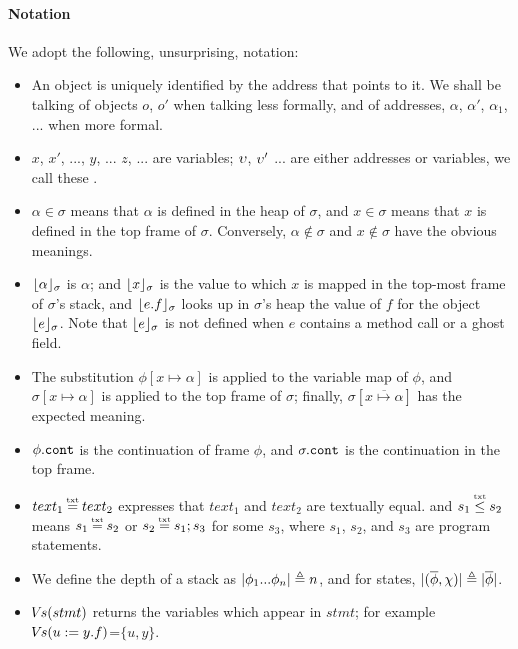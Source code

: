 {\paragraph{Notation} We adopt the following, unsurprising, notation:
\begin{itemize}
\item
{An object is uniquely identified by the address that points to it. We shall be talking of objects $o$, $o'$ when talking less formally, and of addresses, $\alpha$, $\alpha'$, $\alpha_1$, ...  when more formal.}
\item
$x$, $x'$,  ..., $y$, ... $z$, ... are variables;  $\upsilon$, $\upsilon'$ ... are either addresses or variables, we call these \emph{\atoms}.
\item
$\alpha \in \sigma$ means that $\alpha$ is defined in the heap of $\sigma$, and $x\in \sigma$ means that $x$ is defined in the top frame of $\sigma$.
Conversely,  $\alpha\notin\sigma$ and $x\notin\sigma$ %
 have the obvious meanings.
\item
$\lfloor \alpha \rfloor_{\sigma}$  is $\alpha$; and $\lfloor x \rfloor_{\sigma}$  is the value to which  $x$  is mapped in the top-most frame of $\sigma$'s stack, 
and $\lfloor e.f \rfloor_{\sigma}$ looks up in $\sigma$'s heap the value of $f$ for the object  $\lfloor e \rfloor_{\sigma}$.
Note that $\lfloor e \rfloor_{\sigma}$ is not defined when $e$ contains a method call or a ghost field.
\item The substitution
$\phi[x \mapsto \alpha]$ is applied to the variable map  of $\phi$,  
and  $\sigma[x \mapsto \alpha]$ is applied to the top frame of $\sigma$; finally,  $\sigma[\overline{x \mapsto \alpha}]$ %
has the expected meaning.
\item
$\phi.\mbox{\normalfont{\texttt{cont}}}$ is the continuation of frame $\phi$, and  $\sigma.\mbox{\normalfont{\texttt{cont}}}$ is the continuation in the top frame.
\item
$text_1 \txteq text_2$ expresses that $text_1$ and $text_2$ are textually equal.  
and $s_1 \txtin   s_2$  means  $s_1 \txteq  s_2$ or  $s_2 \txteq  s_1; s_3$ for some $s_3$, where $s_1$, $s_2$, and $s_3$ are program statements. 
\item
{We define the depth of a stack as $|\phi_1...\phi_n| \triangleq n$, and for states, $|(\overline \phi, \chi)| \triangleq  |\overline \phi|$.}
\item
{ ${\hspace{-1pt}V\hspace{-1pt}}s(stmt)$ returns the variables which appear in $stmt$; for example ${\hspace{-1pt}V\hspace{-1pt}}s(u:=y.f)$=$\{u,y\}$.}
\end{itemize}

}
